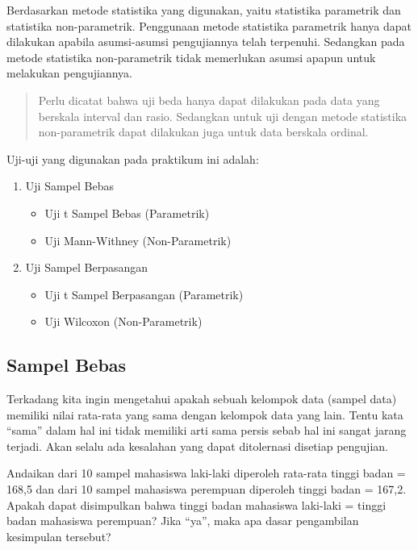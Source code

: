 \documentclass[
]{book}
\providecommand{\tightlist}{%
  \setlength{\itemsep}{0pt}\setlength{\parskip}{0pt}}
\begin{document}
Berdasarkan metode statistika yang digunakan, yaitu statistika parametrik dan statistika non-parametrik. Penggunaan metode statistika parametrik hanya dapat dilakukan apabila asumsi-asumsi pengujiannya telah terpenuhi. Sedangkan pada metode statistika non-parametrik tidak memerlukan asumsi apapun untuk melakukan pengujiannya.

\begin{quote}
Perlu dicatat bahwa uji beda hanya dapat dilakukan pada data yang berskala interval dan rasio. Sedangkan untuk uji dengan metode statistika non-parametrik dapat dilakukan juga untuk data berskala ordinal.
\end{quote}

Uji-uji yang digunakan pada praktikum ini adalah:

\begin{enumerate}
\def\labelenumi{\arabic{enumi}.}
\tightlist
\item
  Uji Sampel Bebas

  \begin{itemize}
  \tightlist
  \item
    Uji t Sampel Bebas (Parametrik)
  \item
    Uji Mann-Withney (Non-Parametrik)
  \end{itemize}
\item
  Uji Sampel Berpasangan

  \begin{itemize}
  \tightlist
  \item
    Uji t Sampel Berpasangan (Parametrik)
  \item
    Uji Wilcoxon (Non-Parametrik)
  \end{itemize}
\end{enumerate}

\hypertarget{sampel-bebas}{%
\subsection{Sampel Bebas}\label{sampel-bebas}}

Terkadang kita ingin mengetahui apakah sebuah kelompok data (sampel data) memiliki nilai rata-rata yang sama dengan kelompok data yang lain. Tentu kata ``sama'' dalam hal ini tidak memiliki arti sama persis sebab hal ini sangat jarang terjadi. Akan selalu ada kesalahan yang dapat ditolernasi disetiap pengujian.

Andaikan dari 10 sampel mahasiswa laki-laki diperoleh rata-rata tinggi badan = 168,5 dan dari 10 sampel mahasiswa perempuan diperoleh tinggi badan = 167,2. Apakah dapat disimpulkan bahwa tinggi badan mahasiswa laki-laki = tinggi badan mahasiswa perempuan? Jika ``ya'', maka apa dasar pengambilan kesimpulan tersebut?
\end{document}
